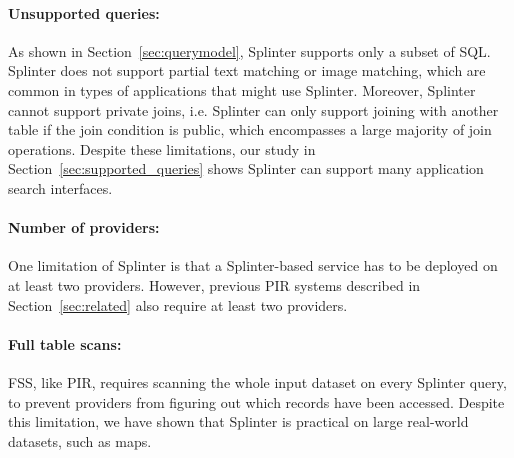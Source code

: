 \paragraph{Unsupported queries:}
As shown in Section~\ref{sec:querymodel}, Splinter supports only a subset of SQL.
Splinter does not support partial text matching or image matching, which are common in types of applications
that might use Splinter. Moreover, Splinter cannot support private joins, i.e. Splinter can only support joining with 
another table if the join condition is public, which encompasses a large majority of join operations. 
Despite these limitations, our study in Section~\ref{sec:supported_queries} 
shows Splinter can support many application search interfaces.

\paragraph{Number of providers:} 
One limitation of Splinter is that 
a Splinter-based service has 
to be deployed on at least two providers. 
However, previous PIR systems described in Section~\ref{sec:related}
also require at least two providers. 



\paragraph{Full table scans:}
FSS, like PIR, requires scanning the whole input dataset on every Splinter query,
to prevent providers from figuring out which records have been accessed. 
Despite this limitation, we have shown that Splinter is practical
on large real-world datasets, such as maps.

